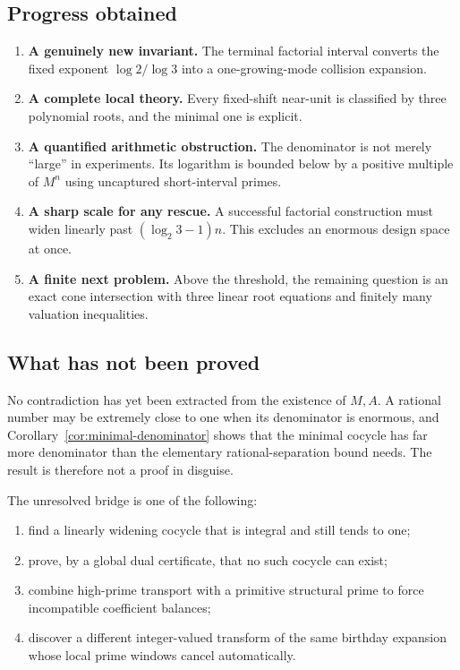 \documentclass[11pt,oneside]{article}
\theoremstyle{definition}
\theoremstyle{remark}
\begin{document}
\subsection{Progress obtained}

\begin{enumerate}
\item \textbf{A genuinely new invariant.}
The terminal factorial interval converts the fixed exponent
$\log2/\log3$ into a one-growing-mode collision expansion.

\item \textbf{A complete local theory.}
Every fixed-shift near-unit is classified by three polynomial roots, and the minimal one is
explicit.

\item \textbf{A quantified arithmetic obstruction.}
The denominator is not merely ``large'' in experiments.  Its logarithm is bounded below by
a positive multiple of $M^n$ using uncaptured short-interval primes.

\item \textbf{A sharp scale for any rescue.}
A successful factorial construction must widen linearly past
$(\log_2 3-1)n$.  This excludes an enormous design space at once.

\item \textbf{A finite next problem.}
Above the threshold, the remaining question is an exact cone intersection with three linear
root equations and finitely many valuation inequalities.
\end{enumerate}

\subsection{What has not been proved}

No contradiction has yet been extracted from the existence of $M,A$.  A rational number may
be extremely close to one when its denominator is enormous, and
Corollary~\ref{cor:minimal-denominator} shows that the minimal cocycle has far more denominator
than the elementary rational-separation bound needs.  The result is therefore not a proof in
disguise.

The unresolved bridge is one of the following:
\begin{enumerate}
\item find a linearly widening cocycle that is integral and still tends to one;
\item prove, by a global dual certificate, that no such cocycle can exist;
\item combine high-prime transport with a primitive structural prime to force incompatible
      coefficient balances;
\item discover a different integer-valued transform of the same birthday expansion whose
      local prime windows cancel automatically.
\end{enumerate}
\end{document}
